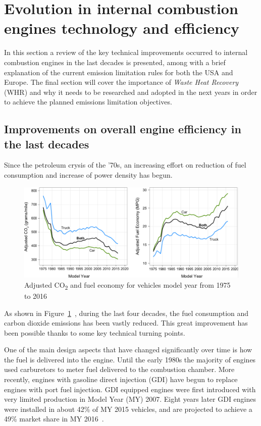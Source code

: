 \section{Evolution in internal combustion engines technology and efficiency}

In this section a review of the key technical improvements occurred to internal combustion engines in the last decades is presented, among with a brief explanation of the current emission limitation rules for both the USA and Europe. The final section will cover the importance of \emph{Waste Heat Recovery} (WHR) and why it needs to be researched and adopted in the next years in order to achieve the planned emissions limitation objectives.

\subsection{Improvements on overall engine efficiency in the last decades}

Since the petroleum crysis of the '70s, an increasing effort on reduction of fuel consumption and increase of power density has begun.

\begin{figure}[ht]
  \centering
  \includegraphics[width=\textwidth]{figures/review/adj_fuel_economy.pdf}
  \caption{Adjusted CO\textsubscript{2} and fuel economy for vehicles model year from 1975 to 2016\label{fig:adj_fuel_economy} }
\end{figure}

As shown in Figure~\ref{fig:adj_fuel_economy}~\cite{EPA2016}, during the last four decades, the fuel consumption and carbon dioxide emissions has been vastly reduced. This great improvement has been possible thanks to some key technical turning points.

One of the main design aspects that have changed significantly over time is how the fuel is delivered into the engine. Until the early 1980s the majority of engines used carburetors to meter fuel delivered to the combustion chamber. More recently, engines with gasoline direct injection (GDI) have begun to replace engines with port fuel injection. GDI equipped engines were first introduced with very limited production in Model Year (MY) 2007. Eight years later GDI engines were installed in about 42\% of MY 2015 vehicles, and are projected to achieve a 49\% market share in MY 2016~\cite{EPA2016}.

